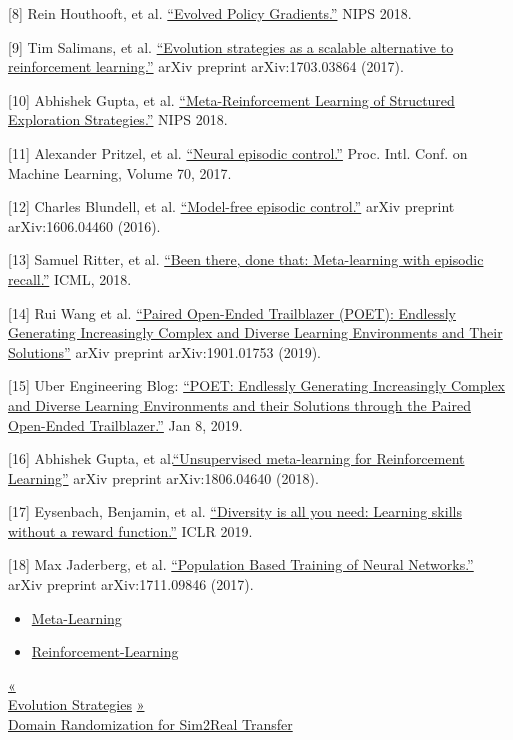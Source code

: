 {[}8{]} Rein Houthooft, et al. \href{https://papers.nips.cc/paper/7785-evolved-policy-gradients.pdf}{``Evolved Policy Gradients.''} NIPS 2018.

{[}9{]} Tim Salimans, et al. \href{https://arxiv.org/abs/1703.03864}{``Evolution strategies as a scalable alternative to reinforcement learning.''} arXiv preprint arXiv:1703.03864 (2017).

{[}10{]} Abhishek Gupta, et al. \href{http://papers.nips.cc/paper/7776-meta-reinforcement-learning-of-structured-exploration-strategies.pdf}{``Meta-Reinforcement Learning of Structured Exploration Strategies.''} NIPS 2018.

{[}11{]} Alexander Pritzel, et al. \href{https://arxiv.org/abs/1703.01988}{``Neural episodic control.''} Proc. Intl. Conf. on Machine Learning, Volume 70, 2017.

{[}12{]} Charles Blundell, et al. \href{https://arxiv.org/abs/1606.04460}{``Model-free episodic control.''} arXiv preprint arXiv:1606.04460 (2016).

{[}13{]} Samuel Ritter, et al. \href{https://arxiv.org/abs/1805.09692}{``Been there, done that: Meta-learning with episodic recall.''} ICML, 2018.

{[}14{]} Rui Wang et al. \href{https://arxiv.org/abs/1901.01753}{``Paired Open-Ended Trailblazer (POET): Endlessly Generating Increasingly Complex and Diverse Learning Environments and Their Solutions''} arXiv preprint arXiv:1901.01753 (2019).

{[}15{]} Uber Engineering Blog: \href{https://eng.uber.com/poet-open-ended-deep-learning/}{``POET: Endlessly Generating Increasingly Complex and Diverse Learning Environments and their Solutions through the Paired Open-Ended Trailblazer.''} Jan 8, 2019.

{[}16{]} Abhishek Gupta, et al.\href{https://arxiv.org/abs/1806.04640}{``Unsupervised meta-learning for Reinforcement Learning''} arXiv preprint arXiv:1806.04640 (2018).

{[}17{]} Eysenbach, Benjamin, et al. \href{https://arxiv.org/abs/1802.06070}{``Diversity is all you need: Learning skills without a reward function.''} ICLR 2019.

{[}18{]} Max Jaderberg, et al. \href{https://arxiv.org/abs/1711.09846}{``Population Based Training of Neural Networks.''} arXiv preprint arXiv:1711.09846 (2017).

\begin{itemize}
\tightlist
\item
  \href{https://lilianweng.github.io/tags/meta-learning/}{Meta-Learning}
\item
  \href{https://lilianweng.github.io/tags/reinforcement-learning/}{Reinforcement-Learning}
\end{itemize}

\href{https://lilianweng.github.io/posts/2019-09-05-evolution-strategies/}{{« }\\
{Evolution Strategies}} \href{https://lilianweng.github.io/posts/2019-05-05-domain-randomization/}{{ »}\\
{Domain Randomization for Sim2Real Transfer}}

